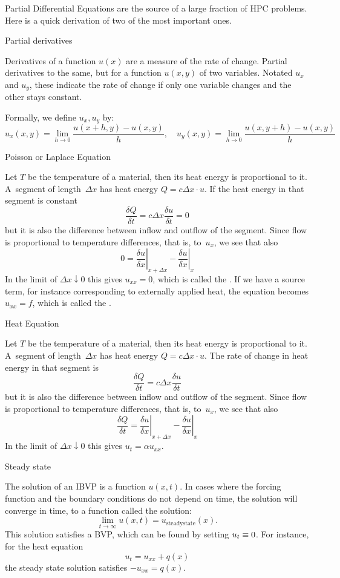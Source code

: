 Partial Differential Equations
are the source of a large fraction of \ac{HPC} problems. Here is a
quick derivation of two of the most important ones.

 {Partial derivatives}

Derivatives of a function $u(x)$ are a measure of the rate of
change. Partial derivatives to the same, but for a function $u(x,y)$
of two variables. Notated $u_x$ and $u_y$, these  indicate the rate of change if only one variable changes
and the other stays constant.

Formally, we define
$u_x,u_y$ by:
\[ u_x(x,y) = \lim_{h\rightarrow0}\frac{u(x+h,y)-u(x,y)}h,\quad
   u_y(x,y) = \lim_{h\rightarrow0}\frac{u(x,y+h)-u(x,y)}h
\]

 {Poisson or Laplace Equation}

Let $T$ be the temperature of a material, then its heat energy is
proportional to it. A~segment of length~$\Delta x$ has heat energy
$Q=c\Delta x\cdot u$. If the heat energy in that
segment is constant
\[ \frac{\delta Q}{\delta t}=c\Delta x\frac{\delta u}{\delta t}=0 \]
but it is also the difference between inflow and outflow of the
segment. Since flow is proportional to temperature differences, that
is, to~$u_x$, we see that also
\[ 0=
    \left.\frac{\delta u}{\delta x}\right|_{x+\Delta x}-
    \left.\frac{\delta u}{\delta x}\right|_{x}
\]
In the limit of $\Delta x\downarrow0$ this gives $u_{xx}=0$, which is
called the . If we have a source term, for
instance corresponding to externally applied heat, the equation
becomes $u_{xx}=f$, which is called the .

 {Heat Equation}

Let $T$ be the temperature of a material, then its heat energy is
proportional to it. A~segment of length~$\Delta x$ has heat energy
$Q=c\Delta x\cdot u$. The rate of change in heat energy in that
segment is
\[ \frac{\delta Q}{\delta t}=c\Delta x\frac{\delta u}{\delta t} \]
but it is also the difference between inflow and outflow of the
segment. Since flow is proportional to temperature differences, that
is, to~$u_x$, we see that also
\[ \frac{\delta Q}{\delta t}=
    \left.\frac{\delta u}{\delta x}\right|_{x+\Delta x}-
    \left.\frac{\delta u}{\delta x}\right|_{x}
\]
In the limit of $\Delta x\downarrow0$ this gives $u_t=\alpha u_{xx}$.

 {Steady state}
\label{app:steadystate}

The solution of an \ac{IBVP} is a function $u(x,t)$. In cases where
the forcing function and the boundary conditions do not depend on
time, the solution will converge in time, to a function called the
 solution:
\[ \lim_{t\rightarrow\infty} u(x,t)=u_{\mathrm{steady state}}(x). \]
This solution satisfies a \ac{BVP}, which can be found by setting
$u_t\equiv\nobreak0$. For instance, for the heat equation \[
u_t=u_{xx}+q(x) \] the steady state solution satisfies $-u_{xx}=q(x)$.

